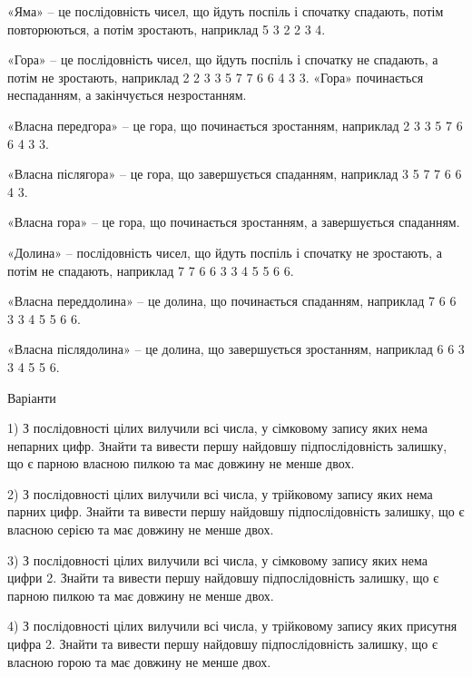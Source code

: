 \documentclass[11pt, ukrainian]{article}
\begin{document}
«Яма» – це послідовність чисел, що йдуть поспіль і спочатку спадають, потім повторюються, а потім зростають, наприклад 5 3 2 2 3 4.

«Гора» – це послідовність чисел, що йдуть поспіль і спочатку не спадають, а потім не зростають, наприклад 2 2 3 3 5 7 7 6 6 4 3 3. «Гора» починається неспаданням, а закінчується незростанням. 

«Власна передгора» – це гора, що починається зростанням, наприклад 2 3 3 5 7 6 6 4 3 3. 

«Власна післягора» – це гора, що завершується спаданням, наприклад  3 5 7 7 6 6 4 3.

«Власна гора» – це гора, що починається зростанням, а завершується спаданням.

«Долина» – послідовність чисел, що йдуть поспіль і спочатку не зростають, а потім не спадають, наприклад 7 7 6 6 3 3 4 5 5 6 6.

«Власна переддолина» – це долина, що починається спаданням, наприклад 7 6 6 3 3 4 5 5 6 6. 

«Власна післядолина» – це долина, що завершується зростанням, наприклад 6 6 3 3 4 5 5 6.

\par \bigskip
\newpage

{\center  Варіанти \par \bigskip\bigskip}

1) \space 
З послідовності цілих вилучили всі числа, у сімковому запису яких нема непарних цифр. Знайти та вивести першу найдовшу підпослідовність залишку, що є парною власною пилкою та має довжину не менше двох.

\par
\vspace{0.9cm}
2) \space 
З послідовності цілих вилучили всі числа, у трійковому запису яких нема парних цифр. Знайти та вивести першу найдовшу підпослідовність залишку, що є власною серією та має довжину не менше двох.

\par
\vspace{0.9cm}
3) \space 
З послідовності цілих вилучили всі числа, у сімковому запису яких нема цифри 2. Знайти та вивести першу найдовшу підпослідовність залишку, що є парною пилкою та має довжину не менше двох.

\par
\vspace{0.9cm}
4) \space 
З послідовності цілих вилучили всі числа, у трійковому запису яких присутня цифра 2. Знайти та вивести першу найдовшу підпослідовність залишку, що є власною горою та має довжину не менше двох.
\end{document}
